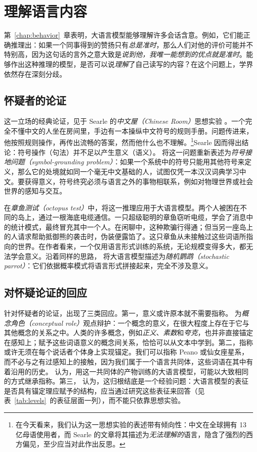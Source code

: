 \section{理解语言内容}\label{sec:understanding}
第~\ref{chap:behavior}~章表明，大语言模型能够理解许多会话含意。例如，它们能正确推理出：如果一个同事得到的赞扬只有{\em 总是准时}，那么人们对他的评价可能并不特别高，因为这句话的言外之意大致是\emph{说到他，我唯一能想到的优点就是准时}。能够作出这种推理的模型，是否可以说\emph{理解}了自己读写的内容？在这个问题上，学界依然存在深刻分歧。

\subsection{怀疑者的论证}
这一立场的经典论证，见于 Searle 的\emph{中文屋（Chinese Room）}思想实验 \citep{searle1980minds}。一个完全不懂中文的人坐在房间里，手边有一本操纵中文符号的规则手册。问题传进来，他按照规则操作，再传出流畅的答案，然而他什么也不理解。\footnote{在今天看来，我们认为这一思想实验的表述带有倾向性：中文在全球拥有 13 亿母语使用者，而 Searle 的文章将其描述为\emph{无法理解的}语言，隐含了强烈的西方偏见，至少应当对此作出反思。}Searle 因而得出结论：符号操作（句法）并不足以产生意义（语义）。\citet{harnard1990symbol} 将这一问题重新表述为\emph{符号接地问题（symbol-grounding problem）}：如果一个系统中的符号只能用其他符号来定义，那么它的处境就如同一个毫无中文基础的人，试图仅凭一本汉汉词典学习中文。要获得意义，符号终究必须与语言之外的事物相联系，例如对物理世界或社会世界的感知与交互。

\citet{bender-koller2020climbing} 在\emph{章鱼测试（octopus test）}中，将这一推理应用于大语言模型。两个人被困在不同的岛上，通过一根海底电缆通信。一只超级聪明的章鱼窃听电缆，学会了消息中的统计模式，最终冒充其中一个人。在闲聊中，这种欺骗行得通；但当另一座岛上的人请求帮助抵御熊的袭击时，伪装便露馅了。这只章鱼从未接触过这些词语所指向的世界。在作者看来，一个仅用语言形式训练的系统，无论规模变得多大，都无法学会意义。沿着同样的思路，\citet{bender2021dangers} 将大语言模型描述为\emph{随机鹦鹉（stochastic parrot）}：它们依据概率模式将语言形式拼接起来，完全不涉及意义。

\subsection{对怀疑论证的回应}
针对怀疑者的论证，出现了三类回应。第一，意义或许原本就不需要指称。\citet{piantadosi2022meaning} 为\emph{概念角色（conceptual role）}观点辩护：一个概念的意义，在很大程度上存在于它与其他概念的关系之中。人类的许多概念，例如{\em 正义}、{\em 素数}和{\em 夸克}，也并非直接锚定在感知上；赋予这些词语意义的概念间关系，恰恰可以从文本中学到。第二，指称或许无须在每个说话者个体身上实现锚定。我们可以指称 Peano 或仙女座星系，而不必与之有过感知上的接触，因为我们属于一个语言共同体，这些词语在其中有着沿用的历史。\citet{mandelkern2024language} 认为，用这一共同体的产物训练的大语言模型，可能以大致相同的方式继承指称。第三，\citet{pavlick2023symbols} 认为，这归根结底是一个经验问题：大语言模型的表征是否具有锚定理应赋予的结构，应当通过研究这些表征来回答（见表~\ref{tab:levels}~的表征层面一列），而不能只依靠思想实验。

